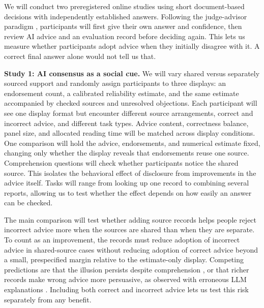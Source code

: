 \documentclass[12pt]{article}
\begin{document}
We will conduct two preregistered online studies using short document-based decisions with independently established answers. Following the judge-advisor paradigm \citep{bonaccio2006advice}, participants will first give their own answer and confidence, then review AI advice and an evaluation record before deciding again. This lets us measure whether participants adopt advice when they initially disagree with it. A correct final answer alone would not tell us that.

\textbf{Study 1: AI consensus as a social cue.} We will vary shared versus separately sourced support and randomly assign participants to three displays: an endorsement count, a calibrated reliability estimate, and the same estimate accompanied by checked sources and unresolved objections. Each participant will see one display format but encounter different source arrangements, correct and incorrect advice, and different task types. Advice content, correctness balance, panel size, and allocated reading time will be matched across display conditions. One comparison will hold the advice, endorsements, and numerical estimate fixed, changing only whether the display reveals that endorsements reuse one source. Comprehension questions will check whether participants notice the shared source. This isolates the behavioral effect of disclosure from improvements in the advice itself. Tasks will range from looking up one record to combining several reports, allowing us to test whether the effect depends on how easily an answer can be checked.

The main comparison will test whether adding source records helps people reject incorrect advice more when the sources are shared than when they are separate. To count as an improvement, the records must reduce adoption of incorrect advice in shared-source cases without reducing adoption of correct advice beyond a small, prespecified margin relative to the estimate-only display. Competing predictions are that the illusion persists despite comprehension \citep{yousif2019illusion}, or that richer records make wrong advice more persuasive, as observed with erroneous LLM explanations \citep{si2024convincingly}. Including both correct and incorrect advice lets us test this risk separately from any benefit.
\end{document}
